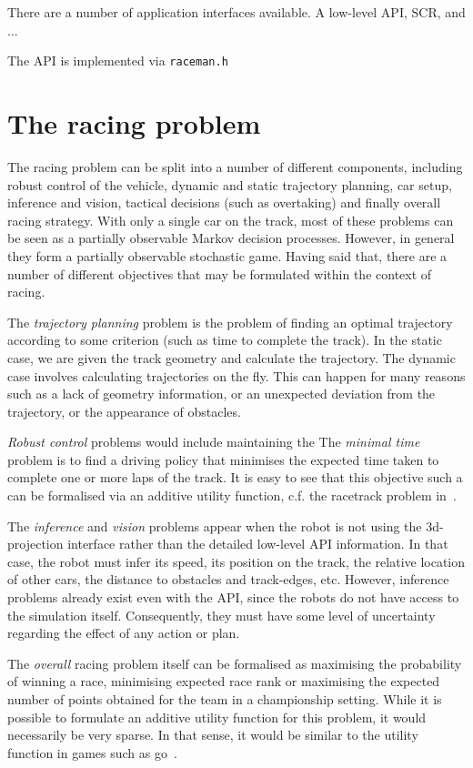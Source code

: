 \documentclass[a4paper]{article}
\begin{document}
There are a number of application interfaces available. A low-level API, SCR, and ...

The API is implemented via \texttt{raceman.h}

\section{The racing problem}

The racing problem can be split into a number of different components, including robust control of the vehicle, dynamic and static trajectory planning, car setup, inference and vision, tactical decisions (such as overtaking) and finally overall racing strategy. With only a single car on the track, most of these problems can be seen as a partially observable Markov decision processes. However, in general they form a partially observable stochastic game. Having said that, there are a number of different objectives that may be formulated within the context of racing.

The \emph{trajectory planning} problem is the problem of finding an optimal trajectory according to some criterion (such as time to complete the track).
In the static case, we are given the track geometry and calculate the trajectory. The dynamic case involves calculating trajectories on the fly. This can happen for many reasons such as a lack of geometry information,  or an unexpected deviation from the trajectory, or the appearance of obstacles.

\emph{Robust control} problems would include maintaining the
The \emph{minimal time} problem is to find a driving policy that minimises the expected time taken to complete one or more laps of the track. It is easy to see that this objective such a can be formalised via an additive utility function, c.f. the racetrack problem in~\cite{Sutton+Barto:1998}.

The \emph{inference} and \emph{vision} problems appear when the robot is not using the 3d-projection interface rather than the detailed low-level API information. In that case, the robot must infer its speed, its position on the track, the relative location of other cars, the distance to obstacles and track-edges, etc. However, inference problems already exist even with the API, since the robots do not have access to the simulation itself. Consequently, they must have some level of uncertainty regarding the effect of any action or plan. 

The \emph{overall} racing problem itself can be formalised as maximising the probability of winning a race, minimising expected race rank or maximising the expected number of points obtained for the team in a championship setting. While it is possible to formulate an additive utility function for this problem, it would necessarily be very sparse. In that sense, it would be similar to the utility function in games such as go~\cite{gelly:uct-go}.



\end{document}
